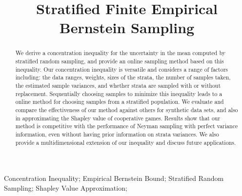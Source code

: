 \documentclass[]{interact}
\theoremstyle{plain}%
\theoremstyle{definition}
\theoremstyle{remark}
\begin{document}
\title{Stratified Finite Empirical Bernstein Sampling}
\author{
}

\maketitle

\begin{abstract}
We derive a concentration inequality for the uncertainty in the mean computed by stratified random sampling, and provide an online sampling method based on this inequality.
Our concentration inequality is versatile and considers a range of factors including: the data ranges, weights, sizes of the strata, the number of samples taken, the estimated sample variances, and whether strata are sampled with or without replacement.
Sequentially choosing samples to minimize this inequality leads to a online method for choosing samples from a stratified population.
We evaluate and compare the effectiveness of our method against others for synthetic data sets, and also in approximating the Shapley value of cooperative games.
Results show that our method is competitive with the performance of Neyman sampling with perfect variance information, even without having prior information on strata variances.
We also provide a multidimensional extension of our inequality and discuss future applications.
\end{abstract}

\begin{keywords}
Concentration Inequality;
Empirical Bernstein Bound;
Stratified Random Sampling;
Shapley Value Approximation;
\end{keywords}
\end{document}
